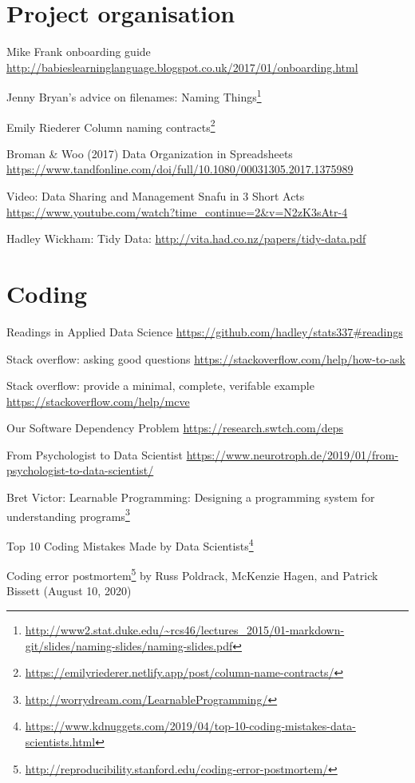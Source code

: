 \documentclass[
  12pt,
  a5paper,
]{book}
\DeclareRobustCommand{\href}[2]{#2\footnote{\url{#1}}}
\begin{document}
\hypertarget{project-organisation-1}{%
\section{Project organisation}\label{project-organisation-1}}

Mike Frank onboarding guide \url{http://babieslearninglanguage.blogspot.co.uk/2017/01/onboarding.html}

Jenny Bryan's advice on filenames: \href{http://www2.stat.duke.edu/~rcs46/lectures_2015/01-markdown-git/slides/naming-slides/naming-slides.pdf}{Naming Things}

Emily Riederer \href{https://emilyriederer.netlify.app/post/column-name-contracts/}{Column naming contracts}

Broman \& Woo (2017) Data Organization in Spreadsheets \url{https://www.tandfonline.com/doi/full/10.1080/00031305.2017.1375989}

Video: Data Sharing and Management Snafu in 3 Short Acts
\url{https://www.youtube.com/watch?time_continue=2\&v=N2zK3sAtr-4}

Hadley Wickham: Tidy Data: \url{http://vita.had.co.nz/papers/tidy-data.pdf}

\hypertarget{coding}{%
\section{Coding}\label{coding}}

Readings in Applied Data Science \url{https://github.com/hadley/stats337\#readings}

Stack overflow: asking good questions \url{https://stackoverflow.com/help/how-to-ask}

Stack overflow: provide a minimal, complete, verifable example \url{https://stackoverflow.com/help/mcve}

Our Software Dependency Problem \url{https://research.swtch.com/deps}

From Psychologist to Data Scientist \url{https://www.neurotroph.de/2019/01/from-psychologist-to-data-scientist/}

Bret Victor: \href{http://worrydream.com/LearnableProgramming/}{Learnable Programming: Designing a programming system for understanding programs}

\href{https://www.kdnuggets.com/2019/04/top-10-coding-mistakes-data-scientists.html}{Top 10 Coding Mistakes Made by Data Scientists}

\href{http://reproducibility.stanford.edu/coding-error-postmortem/}{Coding error postmortem} by Russ Poldrack, McKenzie Hagen, and Patrick Bissett (August 10, 2020)
\end{document}
